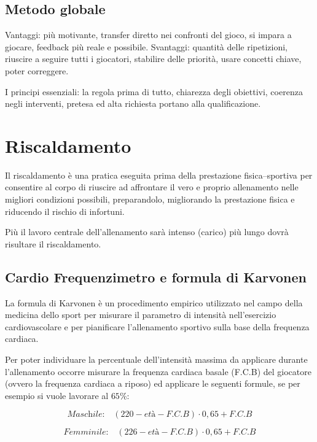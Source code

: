 \subsection{Metodo globale}
Vantaggi: più motivante, transfer diretto nei confronti del gioco, si impara a giocare, feedback più reale e possibile. 
Svantaggi: quantità delle ripetizioni, riuscire a seguire tutti i giocatori, stabilire delle priorità, usare concetti chiave, poter correggere.

I principi essenziali:
la regola prima di tutto,
chiarezza degli obiettivi,
coerenza negli interventi,
pretesa ed alta richiesta portano alla qualificazione.

\section{Riscaldamento}
Il riscaldamento è una pratica eseguita prima della prestazione fisica--sportiva per consentire al corpo di riuscire ad affrontare il vero e proprio allenamento nelle migliori condizioni possibili, preparandolo, migliorando la prestazione fisica e riducendo il rischio di infortuni.

Più il lavoro centrale dell'allenamento  sarà intenso (carico) più lungo
dovrà risultare il riscaldamento.

\subsection{Cardio Frequenzimetro e formula di Karvonen}
La formula di Karvonen è un procedimento empirico utilizzato nel campo della medicina dello sport per misurare il parametro di intensità nell'esercizio cardiovascolare e per pianificare l'allenamento sportivo sulla base della frequenza cardiaca.

Per poter individuare la percentuale dell'intensità massima da applicare durante l'allenamento occorre misurare la frequenza cardiaca basale (F.C.B) del giocatore
(ovvero la frequenza cardiaca a riposo) ed applicare le seguenti formule,
se per esempio si vuole lavorare al $65$\%:
\begin{flushleft}
 \[
\textit{Maschile:} \quad
 \left( 220 - \textit{età} - \textit{F.C.B} \right) \cdot 0,65 + \textit{F.C.B}
 \]
\end{flushleft}
\begin{flushleft}
 \[
\textit{Femminile:} \quad
 \left( 226 - \textit{età} - \textit{F.C.B} \right) \cdot 0,65 + \textit{F.C.B}
 \]
\end{flushleft}